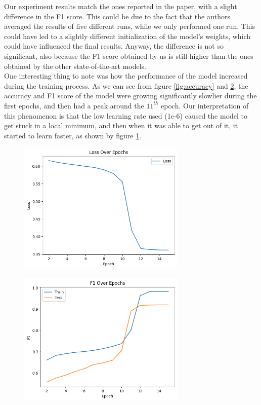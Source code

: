 Our experiment results match the ones reported in the paper, with a slight difference in the F1 score. This could be due to the fact that the authors averaged the results of five different runs, while we only performed one run. This could have led to a slightly different initialization of the model's weights, which could have influenced the final results. Anyway, the difference is not so significant, also because the F1 score obtained by us is still higher than the ones obtained by the other state-of-the-art models. \\ 
One interesting thing to note was how the performance of the model increased during the training process. As we can see from figure \ref{fig:accuracy} and \ref{fig:f1}, the accuracy and F1 score of the model were growing significantly slowlier during the first epochs, and then had a peak around the $11^{th}$ epoch. Our interpretation of this phenomenon is that the low learning rate used (1e-6) caused the model to get stuck in a local minimum, and then when it was able to get out of it, it started to learn faster, as shown by figure \ref{fig:loss}.

\begin{figure}[h]
    \includegraphics[width=8cm]{Loss.png}
    \label{fig:loss}
\end{figure}

\begin{figure}[h]
    \includegraphics[width=8cm]{F1.png}
    \label{fig:f1}
\end{figure}

